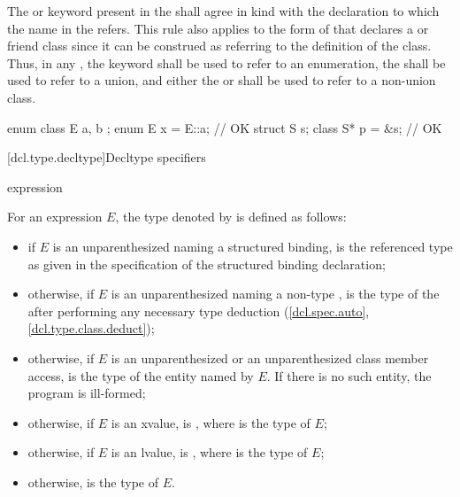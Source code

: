 \pnum
The  or  keyword
present in the
 shall agree in kind with the
declaration to which the name in the
 refers. This rule also applies to
the form of  that declares a
 or friend class since it can be construed
as referring to the definition of the class. Thus, in any
, the  keyword
shall be
used to refer to an enumeration, the 
 shall be used to refer to a union,
and either the  or 
 shall be used to refer to a non-union class.
\begin{example}
\begin{codeblock}
enum class E { a, b };
enum E x = E::a;                // OK
struct S { } s;
class S* p = &s;                // OK
\end{codeblock}
\end{example}

[dcl.type.decltype]{Decltype specifiers}%
%

\begin{bnf}
\br
   \terminal{(} expression \terminal{)}
\end{bnf}

\pnum
{}%
For an expression $E$, the type denoted by  is defined as follows:
\begin{itemize}
\item if $E$ is an unparenthesized 
naming a structured binding,
 is the referenced type as given in
the specification of the structured binding declaration;

\item otherwise, if $E$ is an unparenthesized 
naming a non-type ,
 is the type of the 
after performing any necessary type deduction
(\ref{dcl.spec.auto}, \ref{dcl.type.class.deduct});

\item otherwise, if $E$ is an unparenthesized  or
an unparenthesized
class
member access,  is the
type of the entity named by $E$.
If there is no such entity, the program is ill-formed;

\item otherwise, if $E$ is
an xvalue,  is , where  is the type
of $E$;

\item otherwise, if $E$ is an lvalue, 
is , where  is the type of $E$;

\item otherwise,  is the type of $E$.
\end{itemize}

